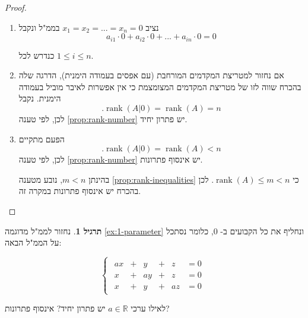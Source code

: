 \documentclass[12pt]{report}
\theoremstyle{plain}
\theoremstyle{definition}
\newtheorem{exercise}{תרגיל}[chapter]
\newcommand{\R}{\mathbb{R}}
\DeclareMathOperator{\rank}{rank}
\newcommand{\0}{\mathbf{0}}
\begin{document}
\begin{proof}\
\begin{enumerate}[label=\alph*.]
\item
נציב
$x_1=x_2=...=x_n=0$
בממ"ל ונקבל
$$
a_{i1}\cdot0+a_{i2}\cdot0+...+a_{in}\cdot 0=0
$$

כנדרש לכל
$1\leq i\leq n$.

\item 
אם נחזור למטריצת המקדמים המורחבת (עם אפסים בעמודה הימנית), הדרגה שלה בהכרח שווה לזו של מטריצת המקדמים המצומצמת כי אין אפשרות לאיבר מוביל בעמודה הימנית. נקבל
$$
.\rank(A|0)=\rank(A)=n
$$
לכן, לפי טענה
\ref{prop:rank-number}
יש פתרון יחיד.

\item 
הפעם מתקיים
$$
.\rank(A|0)=\rank(A)<n
$$
לכן, לפי טענה
\ref{prop:rank-number}
יש אינסוף פתרונות.

בהינתן
$m<n$,
נובע מטענה
\ref{prop:rank-inequalities}
כי
$\rank(A)\leq m<n$.
לכן בהכרח יש אינסוף פתרונות במקרה זה.
\end{enumerate}
\end{proof}

\begin{exercise}
נחזור לממ"ל מדוגמה
\ref{ex:1-parameter}
ונחליף את כל הקבועים ב-
$0$,
כלומר נסתכל על הממ"ל הבאה:

$$
\begin{cases}
\begin{alignedat}{7}
a x &{}+{}&  y &{}+{}&  z &= 0 \\[4pt]
x &{}+{}&  a y &{}+{}&  z &= 0 \\[4pt]
x &{}+{}&  y &{}+{}&  a z &= 0
\end{alignedat}
\end{cases}
$$

לאילו ערכי
$a\in\R$
יש פתרון יחיד? אינסוף פתרונות?
\end{exercise}
\end{document}
